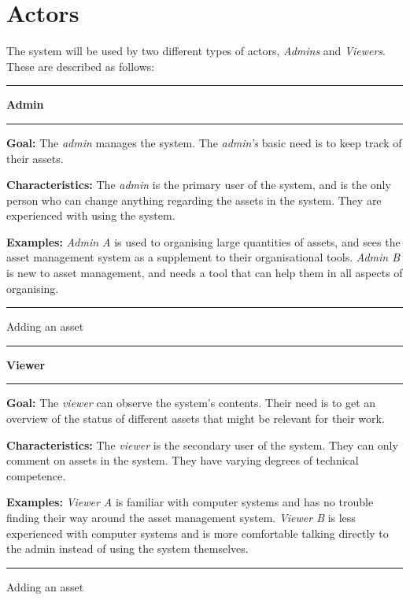 \section{Actors}\label{sc:actors}

The system will be used by two different types of actors, \textit{Admins} and \textit{Viewers}. These are described as follows:

\begin{actor}[H]
    \hrule
    \vskip 0.3cm
    \Large
    \begin{center}
        \textbf{Admin}
    \end{center}
    \vskip 0.1cm
    \hrule
    \vskip 0.2cm
    \normalsize
    
    \textbf{Goal:} The \textit{admin} manages the system. The \textit{admin's} basic need is to keep track of their assets.
    
    \vskip 0.2cm
    
    \textbf{Characteristics:} The \textit{admin} is the primary user of the system, and is the only person who can change anything regarding the assets in the system. They are experienced with using the system.
    
    \vskip 0.2cm
    
    \textbf{Examples:} \textit{Admin A} is used to organising large quantities of assets, and sees the asset management system as a supplement to their organisational tools.
    \vskip 0.1cm
    \textit{Admin B} is new to asset management, and needs a tool that can help them in all aspects of organising.
    
    \vskip 0.4cm
    \hrule
    \vskip 0.2cm
    \caption{Adding an asset} \label{actor:admin}
\end{actor}


\begin{actor}[H]
    \hrule
    \vskip 0.3cm
    \Large
    \begin{center}
        \textbf{Viewer}
    \end{center}
    \vskip 0.1cm
    \hrule
    \vskip 0.2cm
    \normalsize
    
    \textbf{Goal:} The \textit{viewer} can observe the system's contents. Their need is to get an overview of the status of different assets that might be relevant for their work. 
    
    \vskip 0.2cm
    
    \textbf{Characteristics:} The \textit{viewer} is the secondary user of the system. They can only comment on assets in the system. They have varying degrees of technical competence.
    
    \vskip 0.2cm
    
    \textbf{Examples:} \textit{Viewer A} is familiar with computer systems and has no trouble finding their way around the asset management system.
    \vskip 0.1cm
    \textit{Viewer B} is less experienced with computer systems and is more comfortable talking directly to the admin instead of using the system themselves. 
    
    \vskip 0.4cm
    \hrule
    \vskip 0.2cm
    \caption{Adding an asset} \label{actor:viewer}
\end{actor}

